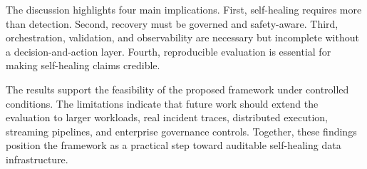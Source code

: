 The discussion highlights four main implications. First, self-healing requires more than detection. Second, recovery must be governed and safety-aware. Third, orchestration, validation, and observability are necessary but incomplete without a decision-and-action layer. Fourth, reproducible evaluation is essential for making self-healing claims credible.

The results support the feasibility of the proposed framework under controlled conditions. The limitations indicate that future work should extend the evaluation to larger workloads, real incident traces, distributed execution, streaming pipelines, and enterprise governance controls. Together, these findings position the framework as a practical step toward auditable self-healing data infrastructure.
